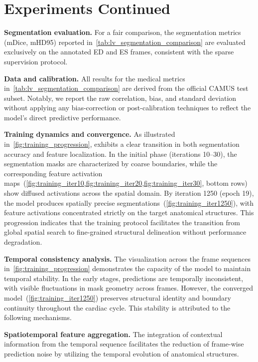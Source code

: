 \section{Experiments Continued}
    \label{sec:exp_con}

\noindent 
\textbf{Segmentation evaluation.} For a fair comparison, the segmentation metrics (mDice, mHD95) reported in~\cref{tab:lv_segmentation_comparison} are evaluated exclusively on the annotated ED and ES frames, consistent with the sparse supervision protocol. 

\noindent
\textbf{Data and calibration.} All results for the medical metrics in~\cref{tab:lv_segmentation_comparison} are derived from the official CAMUS test subset.
Notably, we report the raw correlation, bias, and standard deviation without applying any bias-correction or post-calibration techniques to reflect the model's direct predictive performance.

\noindent
\textbf{Training dynamics and convergence.}
As illustrated in~\cref{fig:training_progression}, \mymodel exhibits a clear transition in both segmentation accuracy and feature localization.
In the initial phase (iterations 10--30), the segmentation masks are characterized by coarse boundaries, while the corresponding feature activation maps~(\cref{fig:training_iter10,fig:training_iter20,fig:training_iter30}, bottom rows) show diffused activations across the spatial domain.
By iteration 1250 (epoch 19), the model produces spatially precise segmentations~(\cref{fig:training_iter1250}), with feature activations concentrated strictly on the target anatomical structures.
This progression indicates that the training protocol facilitates the transition from global spatial search to fine-grained structural delineation without performance degradation.

\noindent
\textbf{Temporal consistency analysis.}
The visualization across the frame sequences in~\cref{fig:training_progression} demonstrates the capacity of the model to maintain temporal stability.
In the early stages, predictions are temporally inconsistent, with visible fluctuations in mask geometry across frames.
However, the converged model~(\cref{fig:training_iter1250}) preserves structural identity and boundary continuity throughout the cardiac cycle.
This stability is attributed to the following mechanisms.

\noindent
\textbf{Spatiotemporal feature aggregation.} The integration of contextual information from the temporal sequence facilitates the reduction of frame-wise prediction noise by utilizing the temporal evolution of anatomical structures.

